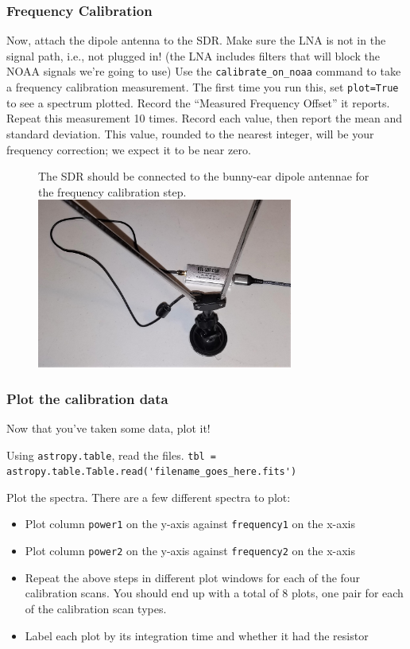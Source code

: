 \documentclass[11pt]{article}
\begin{document}
\subsubsection{Frequency Calibration}
\label{sec:freqcal}
Now, attach the dipole antenna to the SDR.
Make sure the LNA is not in the signal path, i.e., not plugged in!  (the LNA includes filters that will block the NOAA signals we're going to use)
Use the \verb|calibrate_on_noaa| command to take a frequency calibration measurement.
The first time you run this, set \verb|plot=True| to see a spectrum plotted.
Record the ``Measured Frequency Offset'' it reports.
Repeat this measurement 10 times.
Record each value, then report the mean and standard deviation.
This value, rounded to the nearest integer, will be your frequency correction; we expect it to be near zero.

\begin{figure}[htp]
    \centering
    The SDR should be connected to the bunny-ear dipole antennae for the frequency calibration step.\\
\includegraphics[width=0.75\textwidth]{RadioLabPhotos/sdr_to_bunnyears.jpg}
\end{figure}


\subsubsection{Plot the calibration data}
Now that you've taken some data, plot it!

Using \texttt{astropy.table}, read the files.
\verb|tbl = astropy.table.Table.read('filename_goes_here.fits')|

Plot the spectra.  There are a few different spectra to plot:
\begin{itemize}
    \item Plot column \verb|power1| on the y-axis against \verb|frequency1| on the x-axis
    \item Plot column \verb|power2| on the y-axis against \verb|frequency2| on the x-axis
    \item Repeat the above steps in different plot windows for each of the four
        calibration scans.  You should end up with a total of 8 plots, one pair for
        each of the calibration scan types.
    \item Label each plot by its integration time and whether it had the resistor
\end{itemize}
\end{document}
